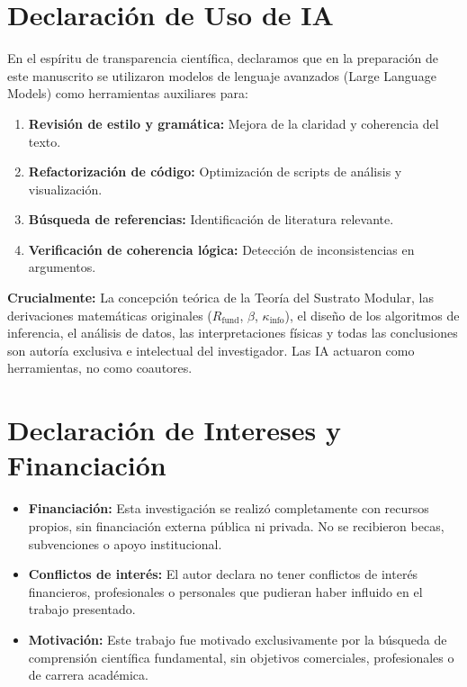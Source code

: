 \documentclass[11pt, a4paper]{article}
\theoremstyle{plain}
\theoremstyle{definition}
\newcommand{\Rfactor}{R_{\text{fund}}}
\newcommand{\Kinfo}{\kappa_{\text{info}}}
\begin{document}
\section*{Declaración de Uso de IA}

En el espíritu de transparencia científica, declaramos que en la preparación de este manuscrito se utilizaron modelos de lenguaje avanzados (Large Language Models) como herramientas auxiliares para:

\begin{enumerate}
    \item \textbf{Revisión de estilo y gramática:} Mejora de la claridad y coherencia del texto.
    \item \textbf{Refactorización de código:} Optimización de scripts de análisis y visualización.
    \item \textbf{Búsqueda de referencias:} Identificación de literatura relevante.
    \item \textbf{Verificación de coherencia lógica:} Detección de inconsistencias en argumentos.
\end{enumerate}

\textbf{Crucialmente:} La concepción teórica de la Teoría del Sustrato Modular, las derivaciones matemáticas originales ($\Rfactor$, $\beta$, $\Kinfo$), el diseño de los algoritmos de inferencia, el análisis de datos, las interpretaciones físicas y todas las conclusiones son autoría exclusiva e intelectual del investigador. Las IA actuaron como herramientas, no como coautores.

\section*{Declaración de Intereses y Financiación}

\begin{itemize}
    \item \textbf{Financiación:} Esta investigación se realizó completamente con recursos propios, sin financiación externa pública ni privada. No se recibieron becas, subvenciones o apoyo institucional.
    
    \item \textbf{Conflictos de interés:} El autor declara no tener conflictos de interés financieros, profesionales o personales que pudieran haber influido en el trabajo presentado.
    
    \item \textbf{Motivación:} Este trabajo fue motivado exclusivamente por la búsqueda de comprensión científica fundamental, sin objetivos comerciales, profesionales o de carrera académica.
\end{itemize}
\end{document}
